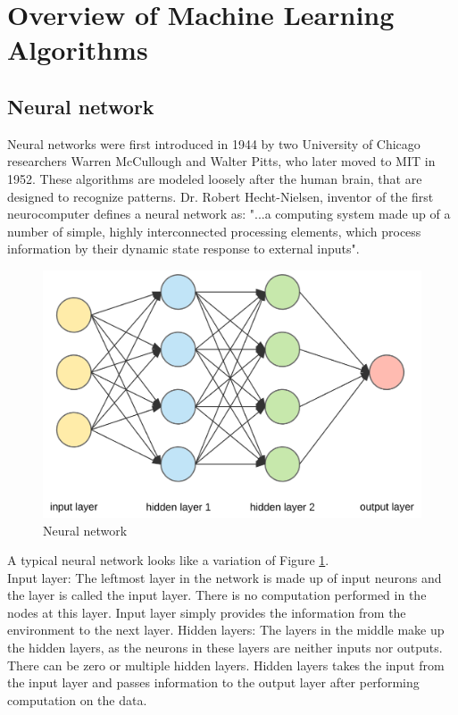 \section{Overview of Machine Learning Algorithms}
\subsection{Neural network}
Neural networks were first introduced in 1944 by two University of Chicago researchers Warren McCullough and Walter Pitts, who later moved to MIT in 1952. These algorithms are modeled loosely after the human brain, that are designed to recognize patterns.  Dr. Robert Hecht-Nielsen, inventor of the first neurocomputer defines a neural network as:
"...a computing system made up of a number of simple, highly interconnected processing elements, which process information by their dynamic state response to external inputs"\cite{Caudill}.
\begin{figure}[htb!]
    \centering
    \includegraphics[scale=0.15]{files/nn.png}
    \caption{Neural network}
    \label{Neural network}
    \end{figure}
    \FloatBarrier
A typical neural network looks like a variation of Figure \ref{Neural network}. \\
Input layer: The leftmost layer in the network is made up of input neurons and the layer is called the input layer. There is no computation performed in the nodes at this layer. Input layer simply provides the information from the environment to the next layer.
Hidden layers: The layers in the middle make up the hidden layers, as the neurons in these layers are neither inputs nor outputs. There can be zero or multiple hidden layers. Hidden layers takes the input from the input layer and passes information to the output layer after performing computation on the data. 
